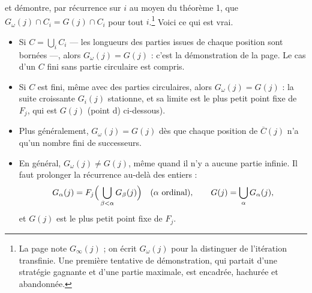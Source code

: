 \documentclass[11pt,a4paper]{article}
\begin{document}
et démontre, par récurrence sur $i$ au moyen du théorème 1, que
$G_\omega(j) \cap C_i = G(j) \cap C_i$ pour tout $i$.\footnote{La page note
$G_\infty(j)$ ; on écrit $G_\omega(j)$ pour la distinguer de l'itération
transfinie. Une première tentative de démonstration, qui partait d'une
stratégie gagnante et d'une partie maximale, est encadrée, hachurée et
abandonnée.} Voici ce qui est vrai.

\begin{itemize}
  \item[a)] Si $C = \bigcup_i C_i$ --- les longueurs des parties issues de
  chaque position sont bornées ---, alors $G_\omega(j) = G(j)$ : c'est la
  démonstration de la page. Le cas d'un $C$ fini sans partie circulaire est
  compris.
  \item[b)] Si $C$ est fini, même avec des parties circulaires, alors
  $G_\omega(j) = G(j)$ : la suite croissante $G_i(j)$ stationne, et sa limite
  est le plus petit point fixe de $F_j$, qui est $G(j)$ (point d) ci-dessous).
  \item[c)] Plus généralement, $G_\omega(j) = G(j)$ dès que chaque position
  de $\overline{C}(j)$ n'a qu'un nombre fini de successeurs.
  \item[d)] En général, $G_\omega(j) \neq G(j)$, même quand il n'y a aucune
  partie infinie. Il faut prolonger la récurrence au-delà des entiers :
  \[
  G_\alpha(j) = F_j\Bigl(\,\bigcup_{\beta < \alpha} G_\beta(j)\Bigr)
  \quad (\alpha \text{ ordinal}),
  \qquad
  G(j) = \bigcup_\alpha G_\alpha(j),
  \]
  et $G(j)$ est le plus petit point fixe de $F_j$.
\end{itemize}
\end{document}
